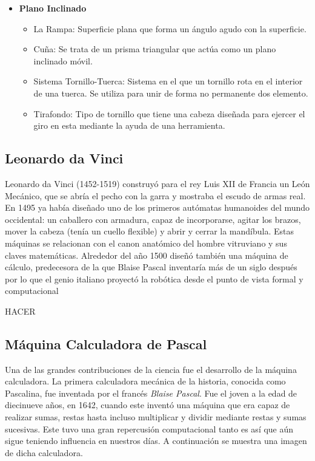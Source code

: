 \documentclass[paper=a4, fontsize=11pt]{scrartcl}
\begin{document}
\begin{itemize}
\begin{itemize}
\end{itemize}

\item \textbf{Plano Inclinado}

\begin{itemize}
\item La Rampa: Superficie plana que forma un ángulo agudo con la superficie.

\item Cuña: Se trata de un prisma triangular que actúa como un plano inclinado móvil.

\item Sistema Tornillo-Tuerca: Sistema en el que un tornillo rota en el interior de una tuerca. Se utiliza para unir de forma no permanente dos elemento.

\item Tirafondo: Tipo de tornillo que tiene una cabeza diseñada para ejercer el giro en esta mediante la ayuda de una herramienta.

\end{itemize}

\end{itemize}

\subsection{Leonardo da Vinci}

Leonardo da Vinci (1452-1519) construyó para el rey Luis XII de Francia un León Mecánico, que se abría el pecho con la garra y mostraba el escudo de armas real. En 1495 ya había diseñado uno de los primeros autómatas humanoides del mundo occidental: un caballero con armadura, capaz de incorporarse, agitar los brazos, mover la cabeza (tenía un cuello flexible) y abrir y cerrar la mandíbula. Estas máquinas se relacionan con el canon anatómico del hombre vitruviano y sus claves matemáticas. Alrededor del año 1500 diseñó también una máquina de cálculo, predecesora de la que Blaise Pascal inventaría más de un siglo después por lo que el genio italiano proyectó la robótica desde el punto de vista formal y computacional


HACER


\subsection{Máquina Calculadora de Pascal}

Una de las grandes contribuciones de la ciencia fue el desarrollo de la máquina calculadora. La primera calculadora mecánica de la historia, conocida como Pascalina, fue inventada por el francés \textit{Blaise Pascal}. Fue el joven a la edad de diecinueve años, en 1642, cuando este inventó una máquina que era capaz de realizar sumas, restas hasta incluso multiplicar y dividir mediante restas y sumas sucesivas. Este tuvo una gran repercusión computacional tanto es así que aún sigue teniendo influencia en nuestros días. A continuación se muestra una imagen de dicha calculadora.
\end{document}
